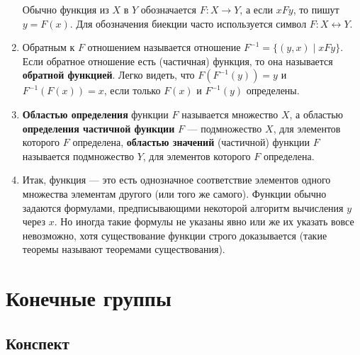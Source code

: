 \begin{enumerate}
Обычно функция из $X$ в $Y$ обозначается $F:X\to Y$, а если $xFy$, то пишут $y=F(x)$. Для обозначения биекции часто используется символ $F:X\leftrightarrow Y$.
\item Обратным к $F$ отношением называется отношение $F^{-1}=\{(y,x)\mid xFy\}$. Если обратное отношение есть (частичная) функция, то она называется \textbf{обратной функцией}. Легко видеть, что $F(F^{-1}(y))=y$ и $F^{-1}(F(x))=x$, если только $F(x)$ и $F^{-1}(y)$ определены.
\item \textbf{Областью определения} функции $F$ называется множество $X$, а областью \textbf{определения частичной функции} $F$ --- подмножество $X$, для элементов которого $F$ определена, \textbf{областью значений} (частичной) функции $F$ называется подмножество $Y$, для элементов которого $F$ определена.
\item Итак, функция --- это есть однозначное соответствие элементов одного множества элементам другого (или того же самого). Функции обычно задаются формулами, предписывающими некоторой алгоритм вычисления $y$ через $x$. Но иногда такие формулы не указаны явно или же их указать вовсе невозможно, хотя существование функции строго доказывается (такие теоремы называют теоремами существования).
\end{enumerate}

\section{Конечные группы}

\subsection*{Конспект}

